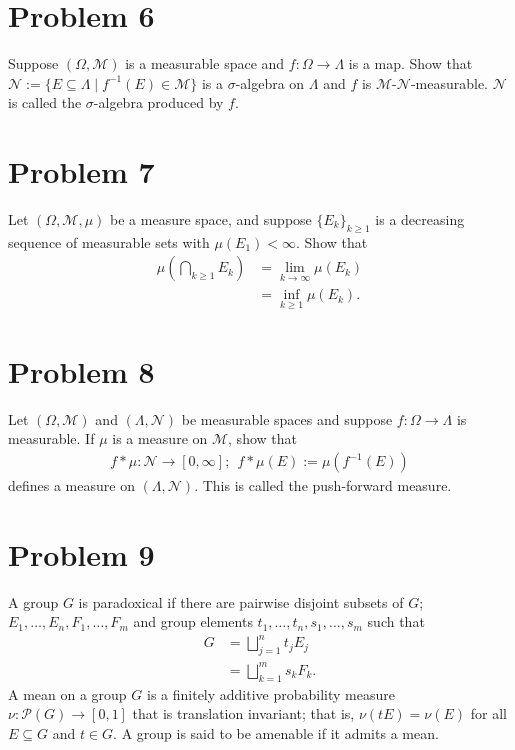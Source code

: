 \documentclass[10pt]{extarticle}
\begin{document}
  \section{Problem 6}%
  Suppose $(\Omega,\mathcal{M})$ is a measurable space and $f: \Omega \rightarrow \Lambda$ is a map. Show that $\mathcal{N}:= \{E\subseteq \Lambda\mid f^{-1}(E)\in \mathcal{M}\}$ is a $\sigma$-algebra on $\Lambda$ and $f$ is $\mathcal{M}$-$\mathcal{N}$-measurable. $\mathcal{N}$ is called the $\sigma$-algebra produced by $f$.
  \section{Problem 7}%
  Let $(\Omega,\mathcal{M},\mu)$ be a measure space, and suppose $\{E_k\}_{k\geq 1}$ is a decreasing sequence of measurable sets with $\mu(E_1) < \infty$. Show that
  \begin{align*}
    \mu\left(\bigcap_{k\geq 1}E_k\right) &= \lim_{k\rightarrow\infty}\mu(E_k)\\
                                         &= \inf_{k\geq 1}\mu(E_k).
  \end{align*}
  \section{Problem 8}%
  Let $(\Omega,\mathcal{M})$ and $(\Lambda,\mathcal{N})$ be measurable spaces and suppose $f: \Omega \rightarrow \Lambda$ is measurable. If $\mu$ is a measure on $\mathcal{M}$, show that
  \begin{align*}
    f\ast \mu: \mathcal{N}\rightarrow [0,\infty];~~f\ast \mu(E) := \mu(f^{-1}(E))
  \end{align*}
  defines a measure on $(\Lambda,\mathcal{N})$. This is called the push-forward measure.
  \section{Problem 9}%
  A group $G$ is paradoxical if there are pairwise disjoint subsets of $G$; $E_1,\dots,E_n,F_1,\dots,F_m$ and group elements $t_1,\dots,t_n,s_1,\dots,s_m$ such that
  \begin{align*}
    G &= \bigsqcup_{j=1}^{n}t_jE_j\\
      &= \bigsqcup_{k=1}^{m}s_kF_k.
  \end{align*}
  A mean on a group $G$ is a finitely additive probability measure $\nu: \mathcal{P}(G)\rightarrow [0,1]$ that is translation invariant; that is, $\nu(tE) = \nu(E)$ for all $E\subseteq G$ and $t\in G$. A group is said to be amenable if it admits a mean.\\
\end{document}
